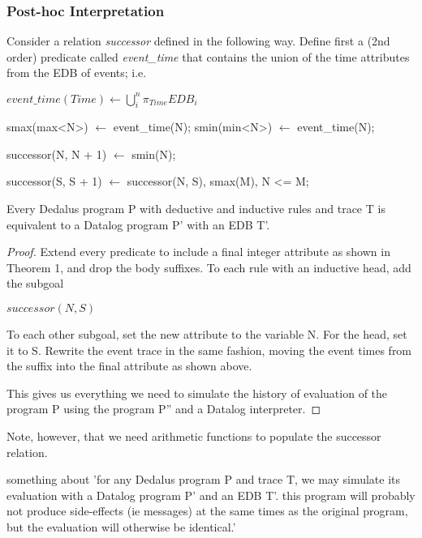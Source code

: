 \subsubsection{Post-hoc Interpretation}

Consider a relation \emph{successor} defined in the following way.
Define first a (2nd order) predicate called \emph{event\_time} 
that contains the union of the time attributes from the EDB of events; i.e.

$event\_time(Time) \leftarrow \displaystyle\bigcup_{i}^n \pi_{Time}EDB_{i}$

\begin{Dedalus}
smax(max<N>) \(\leftarrow\) event\_time(N);
smin(min<N>) \(\leftarrow\) event\_time(N);

successor(N, N + 1) \(\leftarrow\) smin(N);

successor(S, S + 1) \(\leftarrow\) 
    successor(N, S),
    smax(M),
    N <= M;
\end{Dedalus}


\begin{theorem}
Every Dedalus program P with deductive and inductive rules and trace T is equivalent to a Datalog program P' with an EDB T'.
\end{theorem}

\begin{proof}

Extend every predicate to include a final integer attribute as shown in Theorem 1, and drop the body suffixes.  To each rule with an 
inductive head, add the subgoal 

$successor(N, S)$

To each other subgoal, set the new attribute to the variable N.  For the head, set it to S.  Rewrite the event trace in the same fashion, 
moving the event times from the suffix into the final attribute as shown above.


This gives us everything we need to simulate the history of evaluation of the program P using the program P'' and a Datalog interpreter.

\end{proof}

Note, however, that we need arithmetic functions to populate the successor relation.

\begin{theorem}
something about 'for any Dedalus program P and trace T, we may simulate its evaluation with a Datalog program P' and an EDB T'.  this program
will probably not produce side-effects (ie messages) at the same times as the original program, but the evaluation will otherwise be identical.'
\end{theorem}

